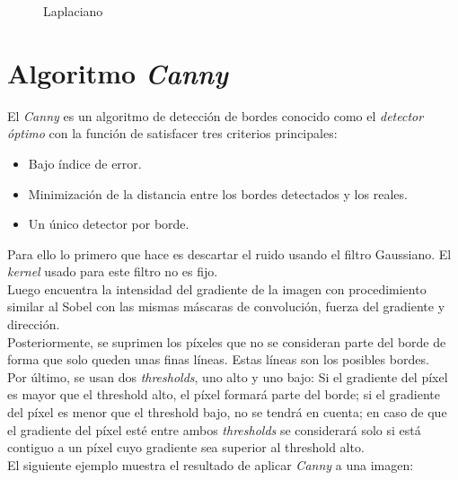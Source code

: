\begin{figure}[H]
  \centering \setlength\fboxsep{0pt} \setlength\fboxrule{0.5pt}
  \caption{Laplaciano}
\end{figure}

\section{Algoritmo \emph{Canny}}\label{tecnica:canny}
El \emph{Canny} \emph{\citep*[A computational approach to edge
  detection]{canny1986computational}}
\emph{\citep*[Canny]{opencv_book-bib}} \emph{\citep*[5.1 Edge
  Tracking]{toennies2012guide}} es un algoritmo de detección de bordes
conocido como el \emph{detector óptimo} con la función de satisfacer
tres criterios principales:
\begin{itemize}
\item Bajo índice de error.
\item Minimización de la distancia entre los bordes detectados y los
  reales.
\item Un único detector por borde.
\end{itemize}
Para ello lo primero que hace es descartar el ruido usando el filtro
Gaussiano.
El \emph{kernel} usado para este filtro no es fijo.\\
Luego encuentra la intensidad del gradiente de la imagen con
procedimiento similar al Sobel con las mismas máscaras de convolución,
fuerza del gradiente y dirección.\\
Posteriormente, se suprimen los píxeles que no se consideran parte del
borde de forma que solo queden unas finas líneas. Estas líneas son los posibles bordes.\\
Por último, se usan dos \emph{thresholds}, uno alto y uno bajo: Si el
gradiente del píxel es mayor que el threshold alto, el píxel formará
parte del borde; si el gradiente del píxel es menor que el threshold
bajo, no se tendrá en cuenta; en caso de que el gradiente del píxel
esté entre ambos \emph{thresholds} se considerará solo si está
contiguo a un píxel cuyo gradiente sea superior al threshold alto.\\
El siguiente ejemplo muestra el resultado de aplicar \emph{Canny} a
una imagen:

